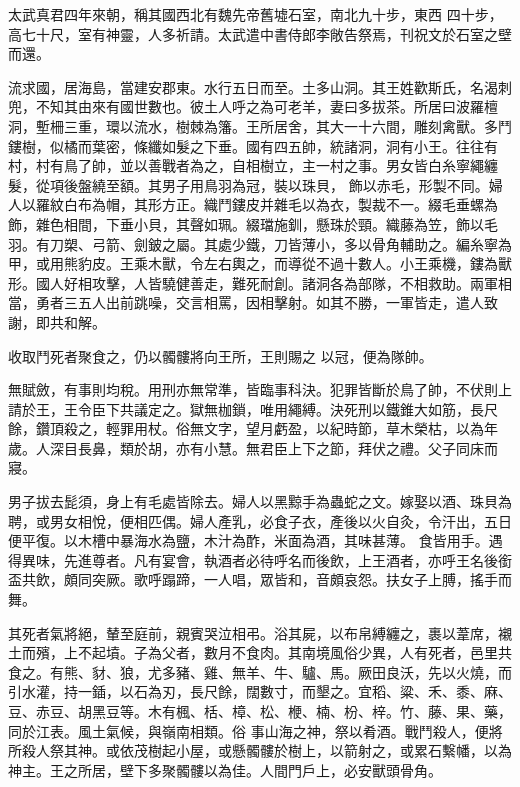 \begin{pinyinscope}
 太武真君四年來朝，稱其國西北有魏先帝舊墟石室，南北九十步，東西
 四十步，高七十尺，室有神靈，人多祈請。太武遣中書侍郎李敞告祭焉，刊祝文於石室之壁而還。



 流求國，居海島，當建安郡東。水行五日而至。土多山洞。其王姓歡斯氏，名渴刺兜，不知其由來有國世數也。彼土人呼之為可老羊，妻曰多拔茶。所居曰波羅檀洞，塹柵三重，環以流水，樹棘為籓。王所居舍，其大一十六間，雕刻禽獸。多鬥鏤樹，似橘而葉密，條纖如髮之下垂。國有四五帥，統諸洞，洞有小王。往往有村，村有鳥了帥，並以善戰者為之，自相樹立，主一村之事。男女皆白糸寧繩纏髮，從項後盤繞至額。其男子用鳥羽為冠，裝以珠貝，
 飾以赤毛，形製不同。婦人以羅紋白布為帽，其形方正。織鬥鏤皮并雜毛以為衣，製裁不一。綴毛垂螺為飾，雜色相間，下垂小貝，其聲如珮。綴璫施釧，懸珠於頸。織藤為笠，飾以毛羽。有刀槊、弓箭、劍鈹之屬。其處少鐵，刀皆薄小，多以骨角輔助之。編糸寧為甲，或用熊豹皮。王乘木獸，令左右輿之，而導從不過十數人。小王乘機，鏤為獸形。國人好相攻擊，人皆驍健善走，難死耐創。諸洞各為部隊，不相救助。兩軍相當，勇者三五人出前跳噪，交言相罵，因相擊射。如其不勝，一軍皆走，遣人致謝，即共和解。



 收取鬥死者聚食之，仍以髑髏將向王所，王則賜之
 以冠，便為隊帥。



 無賦斂，有事則均稅。用刑亦無常準，皆臨事科決。犯罪皆斷於鳥了帥，不伏則上請於王，王令臣下共議定之。獄無枷鎖，唯用繩縛。決死刑以鐵錐大如筋，長尺餘，鑽頂殺之，輕罪用杖。俗無文字，望月虧盈，以紀時節，草木榮枯，以為年歲。人深目長鼻，類於胡，亦有小慧。無君臣上下之節，拜伏之禮。父子同床而寢。



 男子拔去髭須，身上有毛處皆除去。婦人以黑黥手為蟲蛇之文。嫁娶以酒、珠貝為聘，或男女相悅，便相匹偶。婦人產乳，必食子衣，產後以火自灸，令汗出，五日便平復。以木槽中暴海水為鹽，木汁為酢，米面為酒，其味甚薄。
 食皆用手。遇得異味，先進尊者。凡有宴會，執酒者必待呼名而後飲，上王酒者，亦呼王名後銜盃共飲，頗同突厥。歌呼蹋蹄，一人唱，眾皆和，音頗哀怨。扶女子上膊，搖手而舞。



 其死者氣將絕，輦至庭前，親賓哭泣相弔。浴其屍，以布帛縛纏之，裹以葦席，襯土而殯，上不起墳。子為父者，數月不食肉。其南境風俗少異，人有死者，邑里共食之。有熊、豺、狼，尤多豬、雞、無羊、牛、驢、馬。厥田良沃，先以火燒，而引水灌，持一鍤，以石為刃，長尺餘，闊數寸，而墾之。宜稻、粱、禾、黍、麻、豆、赤豆、胡黑豆等。木有楓、栝、樟、松、楩、楠、枌、梓。竹、藤、果、藥，同於江表。風土氣候，與嶺南相類。俗
 事山海之神，祭以肴酒。戰鬥殺人，便將所殺人祭其神。或依茂樹起小屋，或懸髑髏於樹上，以箭射之，或累石繫幡，以為神主。王之所居，壁下多聚髑髏以為佳。人間門戶上，必安獸頭骨角。




\end{pinyinscope}
